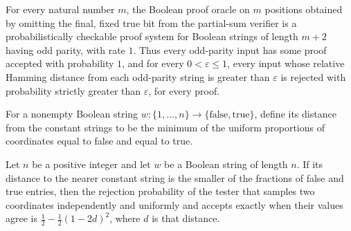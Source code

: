 \begin{theorem}
\label{FABL.oddWeightShortProofPCPPSystem_isPCPP}
\leanok
{}
For every natural number $m$, the Boolean proof oracle on $m$ positions obtained by
omitting the final, fixed true bit from the partial-sum verifier is a probabilistically
checkable proof system for Boolean strings of length $m+2$ having odd parity, with rate
$1$. Thus every odd-parity input has some proof accepted with probability $1$, and for
every $0<\varepsilon\le 1$, every input whose relative Hamming distance from each
odd-parity string is greater than $\varepsilon$ is rejected with probability strictly
greater than $\varepsilon$, for every proof.
\end{theorem}

\begin{definition}
\label{FABL.allEqualStringDistance}
\leanok
{}
For a nonempty Boolean string
$w\colon\{1,\ldots,n\}\to\{\mathrm{false},\mathrm{true}\}$, define its distance from the
constant strings to be the minimum of the uniform proportions of coordinates equal to
false and equal to true.
\end{definition}

\begin{theorem}
\label{FABL.allEqualStringTester_rejectionProbability_eq_distanceFormula}
\leanok
{}
Let $n$ be a positive integer and let $w$ be a Boolean string of length $n$. If its
distance to the nearer constant string is the smaller of the fractions of false and true
entries, then the rejection probability of the tester that samples two coordinates
independently and uniformly and accepts exactly when their values agree is
$\frac12-\frac12(1-2d)^2$, where $d$ is that distance.
\end{theorem}

